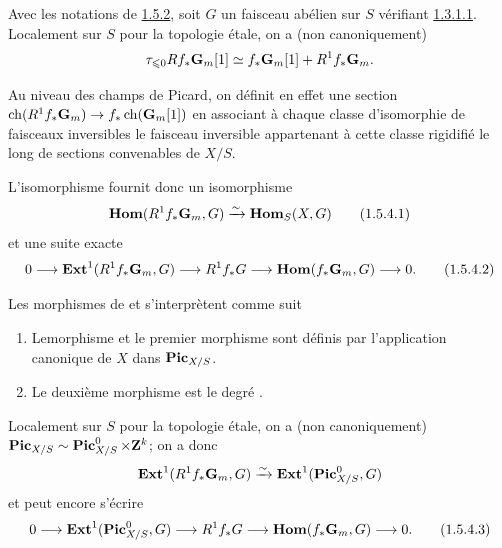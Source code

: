 \documentclass[10pt]{../fichiers-configuration-latex/smfart}
\begin{document}
\subsubsection{}
Avec les notations de \hyperref[XVIII.thm1.5.2]{1.5.2}, soit $G$ un faisceau
abélien sur $S$ 
vérifiant \hyperref[XVIII.par1.3.1.1]{1.3.1.1}. Localement sur $S$ pour la topologie
étale, on a (non canoniquement)
$$
\tau_{\leqslant 0}
Rf_{\ast}\mathbf{G}_{m}[1]\simeq
f_{\ast}\mathbf{G}_{m}[1]+R^{1}f_{\ast}\mathbf{G}_{m}{}.
$$

Au niveau des champs de Picard, on définit en effet une section
$\operatorname{ch}(R^{1}f_{\ast}\mathbf{G}_{m})\rightarrow
f_{\ast}\operatorname{ch}(\mathbf{G}_{m}[1])$ en associant à chaque classe
d'isomorphie de faisceaux inversibles le faisceau inversible
appartenant à cette classe rigidifié le long de sections convenables
de $X/S$.

L'isomorphisme  fournit donc un isomorphisme
\begin{equation*}
\operatorname{\mathbf{Hom}}(R^{1}f_{\ast}\mathbf{G}_{m},G)\xrightarrow{\sim}\operatorname{\mathbf{Hom}}_{S}(X,G){}\tag{1.5.4.1}
\end{equation*}%
et une suite exacte
\begin{equation*}
0\longrightarrow
\operatorname{\mathbf{Ext}}^{1}(R^{1}f_{\ast}\mathbf{G}_{m},G)\longrightarrow
R^1f_{\ast}G\longrightarrow
\operatorname{\mathbf{Hom}}(f_{\ast}\mathbf{G}_{m},G)\longrightarrow 0{}.\tag{1.5.4.2}
\end{equation*}

Les morphismes de  et  s'interprètent
comme suit  
\begin{enumerate}
\renewcommand{\theenumi}{\alph{enumi}}
\renewcommand{\labelenumi}{\theenumi)}
\item Le\pageoriginale morphisme  et le premier
  morphisme  sont définis par l'application canonique
  de $X$ dans $\operatorname{\mathbf{Pic}}_{X/S}$.

\item Le deuxième morphisme  est le degré .
\end{enumerate}

Localement sur $S$ pour la topologie étale, on a (non canoniquement)
$\operatorname{\mathbf{Pic}}_{X/S}\sim \operatorname{\mathbf{Pic}}^{0}_{X/S}\times \mathbf{Z}^{k}$; on a donc
$$
\operatorname{\mathbf{Ext}}^{1}(R^{1}f_{\ast}\mathbf{G}_{m},G)\xrightarrow{\sim}\operatorname{\mathbf{Ext}}^{1}(\operatorname{\mathbf{Pic}}^{0}_{X/S}, G)
$$
et  peut encore s'écrire
\begin{equation*}
0 \longrightarrow \operatorname{\mathbf{Ext}}^{1}(\operatorname{\mathbf{Pic}}^{0}_{X/S},G)\longrightarrow
R^{1}f_{\ast}G\longrightarrow
\operatorname{\mathbf{Hom}}(f_{\ast}\mathbf{G}_{m},G)\longrightarrow 0{}.\tag{1.5.4.3}
\end{equation*}
\end{document}
